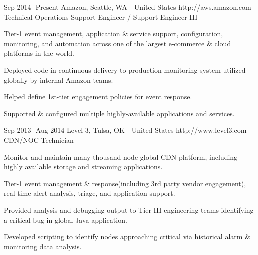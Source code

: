 \documentclass[10pt]{article} %
\begin{document}
\job
{Sep 2014 -}{Present}
{Amazon, Seattle, WA - United States}
{http://aws.amazon.com}
{Technical Operations Support Engineer / Support Engineer III}
{
\begin{itemize-noindent}
\item{Tier-1 event management, application \& service support, configuration, monitoring, and automation across one of the largest e-commerce \& cloud platforms in the world.}
\item{Deployed code in continuous delivery to production monitoring system utilized globally by internal Amazon teams.}
\item{Helped define 1st-tier engagement policies for event response.}
\item{Supported \& configured multiple highly-available applications and services.}
\end{itemize-noindent}

}



\job
{Sep 2013 -}{Aug 2014}
{Level 3, Tulsa, OK - United States}
{http://www.level3.com}
{CDN/NOC Technician}
{
\begin{itemize-noindent}
\item{Monitor and maintain many thousand node global CDN platform, including highly available storage and streaming applications.}
\item{Tier-1 event management \& response(including 3rd party vendor engagement), real time alert analysis, triage, and application support.}
\item{Provided analysis and debugging output to Tier III engineering teams identifying a critical bug in global Java application.}
\item{Developed scripting to identify nodes approaching critical via historical alarm \& monitoring data analysis.}
\end{itemize-noindent}
}

\end{document}
